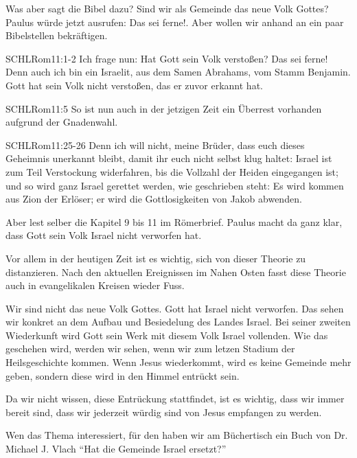 \begin{otsblock}
        Was aber sagt die Bibel dazu? Sind wir als Gemeinde das neue Volk Gottes? Paulus würde jetzt ausrufen: Das sei ferne!.
        Aber wollen wir anhand an ein paar Bibelstellen bekräftigen.
        \begin{bibelbox}{SCHL}{Rom}{11:1-2}
        Ich frage nun: Hat Gott sein Volk verstoßen? Das sei ferne! Denn auch ich bin ein Israelit, aus dem Samen Abrahams, vom Stamm Benjamin. Gott hat sein Volk nicht verstoßen, das er zuvor erkannt hat. 
        \end{bibelbox}
        \begin{bibelbox}{SCHL}{Rom}{11:5}
            So ist nun auch in der jetzigen Zeit ein Überrest vorhanden aufgrund der Gnadenwahl.
        \end{bibelbox}
        \begin{bibelbox}{SCHL}{Rom}{11:25-26}
            Denn ich will nicht, meine Brüder, dass euch dieses Geheimnis unerkannt bleibt, damit ihr euch nicht selbst klug haltet: Israel ist zum Teil Verstockung widerfahren, bis die Vollzahl der Heiden eingegangen ist; und so wird ganz Israel gerettet werden, wie geschrieben steht: Es wird kommen aus Zion der Erlöser; er wird die Gottlosigkeiten von Jakob abwenden.
        \end{bibelbox}
        Aber lest selber die Kapitel 9 bis 11 im Römerbrief. Paulus macht da ganz klar, dass Gott sein Volk Israel nicht verworfen hat. 

        Vor allem in der heutigen Zeit ist es wichtig, sich von dieser Theorie zu distanzieren. Nach den aktuellen Ereignissen im Nahen Osten fasst diese Theorie auch in evangelikalen Kreisen wieder Fuss.
    \end{otsblock}
    \begin{otsblock}[Schlussfolgerung]
        Wir sind nicht das neue Volk Gottes. Gott hat Israel nicht verworfen. Das sehen wir konkret an dem Aufbau und Besiedelung des Landes Israel. Bei seiner zweiten Wiederkunft wird Gott sein Werk mit diesem Volk Israel vollenden. Wie das geschehen wird, werden wir sehen, wenn wir zum letzen Stadium der Heilsgeschichte kommen. Wenn Jesus wiederkommt, wird es keine Gemeinde mehr geben, sondern diese wird in den Himmel entrückt sein.

        Da wir nicht wissen,  diese Entrückung stattfindet, ist es wichtig, dass wir immer bereit sind, dass wir jederzeit würdig sind von Jesus empfangen zu werden. 

        Wen das Thema interessiert, für den haben wir am Büchertisch ein Buch von Dr. Michael J. Vlach \enquote{Hat die Gemeinde Israel ersetzt?} 
        
    \end{otsblock}
